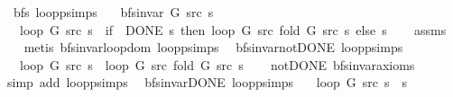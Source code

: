 \begin{isabellebody}
\endisatagproof
{\isafoldproof}%
%
\isadelimproof
\isanewline
%
\endisadelimproof
\isanewline
{}\isamarkupfalse%
\ {\isacharparenleft}{\kern0pt}\ bfs{\isacharparenright}{\kern0pt}\ loop{\isacharunderscore}{\kern0pt}psimps{\isacharcolon}{\kern0pt}\isanewline
\ \ \ {\isachardoublequoteopen}bfs{\isacharunderscore}{\kern0pt}invar{\isacharprime}{\kern0pt}\ G\ src\ s{\isachardoublequoteclose}\isanewline
\ \ \ {\isachardoublequoteopen}loop\ G\ src\ s\ {\isacharequal}{\kern0pt}\ {\isacharparenleft}{\kern0pt}if\ {\isasymnot}\ DONE\ s\ then\ loop\ G\ src\ {\isacharparenleft}{\kern0pt}fold\ G\ src\ s{\isacharparenright}{\kern0pt}\ else\ s{\isacharparenright}{\kern0pt}{\isachardoublequoteclose}\isanewline
%
\isadelimproof
\ \ %
\endisadelimproof
%
\isatagproof
{}\isamarkupfalse%
\ assms\isanewline
\ \ \isamarkupfalse%
\ {\isacharparenleft}{\kern0pt}metis\ bfs{\isacharunderscore}{\kern0pt}invar{\isachardot}{\kern0pt}loop{\isacharunderscore}{\kern0pt}dom\ loop{\isachardot}{\kern0pt}psimps{\isacharparenright}{\kern0pt}%
\endisatagproof
{\isafoldproof}%
%
\isadelimproof
\isanewline
%
\endisadelimproof
\isanewline
{}\isamarkupfalse%
\ {\isacharparenleft}{\kern0pt}\ bfs{\isacharunderscore}{\kern0pt}invar{\isacharunderscore}{\kern0pt}not{\isacharunderscore}{\kern0pt}DONE{\isacharparenright}{\kern0pt}\ loop{\isacharunderscore}{\kern0pt}psimps{\isacharcolon}{\kern0pt}\isanewline
\ \ \ {\isachardoublequoteopen}loop\ G\ src\ s\ {\isacharequal}{\kern0pt}\ loop\ G\ src\ {\isacharparenleft}{\kern0pt}fold\ G\ src\ s{\isacharparenright}{\kern0pt}{\isachardoublequoteclose}\isanewline
%
\isadelimproof
\ \ %
\endisadelimproof
%
\isatagproof
{}\isamarkupfalse%
\ not{\isacharunderscore}{\kern0pt}DONE\ bfs{\isacharunderscore}{\kern0pt}invar{\isacharunderscore}{\kern0pt}axioms\isanewline
\ \ \isamarkupfalse%
\ {\isacharparenleft}{\kern0pt}simp\ add{\isacharcolon}{\kern0pt}\ loop{\isacharunderscore}{\kern0pt}psimps{\isacharparenright}{\kern0pt}%
\endisatagproof
{\isafoldproof}%
%
\isadelimproof
\isanewline
%
\endisadelimproof
\isanewline
{}\isamarkupfalse%
\ {\isacharparenleft}{\kern0pt}\ bfs{\isacharunderscore}{\kern0pt}invar{\isacharunderscore}{\kern0pt}DONE{\isacharparenright}{\kern0pt}\ loop{\isacharunderscore}{\kern0pt}psimps{\isacharcolon}{\kern0pt}\isanewline
\ \ \ {\isachardoublequoteopen}loop\ G\ src\ s\ {\isacharequal}{\kern0pt}\ s{\isachardoublequoteclose}\isanewline

\end{isabellebody}
